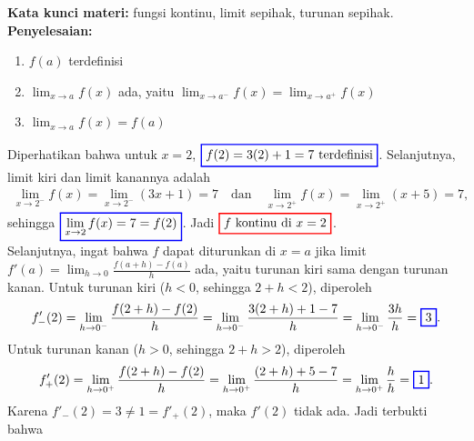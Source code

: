 \documentclass[10pt,openany,a4paper]{article}
\theoremstyle{definition}
\theoremstyle{definition}
\theoremstyle{plain}
\newenvironment{jawab}[2][tes]{%
\par\noindent\textbf{Kata kunci materi:} #1.\\
\textbf{Penyelesaian:} #2%
}{}
\begin{document}
\begin{enumerate}
\begin{jawab}[fungsi kontinu, limit sepihak, turunan sepihak]
{                \begin{enumerate}
                    \item \(f(a)\) terdefinisi
                    \item \(\displaystyle \lim_{x \to a} f(x)\) ada, yaitu $\displaystyle \lim_{x \to a^-} f(x) = \lim_{x \to a^+} f(x)$
                    \item \(\displaystyle\lim_{x \to a} f(x) = f(a)\)
                \end{enumerate}
                Diperhatikan bahwa untuk $x=2$, $\colorlet{oldcolor}{.}
        \color{blue}
        \setlength{\fboxrule}{1pt} \boxed{\color{oldcolor}f(2) = 3(2)+1 = 7~\text{terdefinisi}}\color{oldcolor}$. Selanjutnya, limit kiri dan limit kanannya adalah
                \begin{align*}
                    \lim_{x\to 2^-} f(x) = \lim_{x\to 2^-} (3x+1) = 7 \quad\text{dan}\quad \lim_{x\to 2^+} f(x) = \lim_{x\to 2^+} (x+5) = 7,
                \end{align*}
                sehingga $\colorlet{oldcolor}{.}
        \color{blue}
        \setlength{\fboxrule}{1pt} \boxed{\color{oldcolor}\lim_{x\to 2} f(x) = 7 = f(2)}\color{oldcolor}$. Jadi $\colorlet{oldcolor}{.}
        \color{red}
        \setlength{\fboxrule}{1pt} \boxed{\color{oldcolor}f \text{ kontinu di } x=2}\color{oldcolor}$.\\
                Selanjutnya, ingat bahwa $f$ dapat diturunkan di $x=a$ jika limit $\displaystyle f'(a)=\lim_{h\to 0}\frac{f(a+h)-f(a)}{h}$ ada, yaitu turunan kiri sama dengan turunan kanan. Untuk turunan kiri ($h<0$, sehingga $2+h<2$), diperoleh
                \begin{align*}
                    f'_-(2) = \lim_{h\to 0^-}\frac{f(2+h)-f(2)}{h} = \lim_{h\to 0^-}\frac{3(2+h)+1-7}{h} = \lim_{h\to 0^-}\frac{3h}{h} = \colorlet{oldcolor}{.}
        \color{blue}
        \setlength{\fboxrule}{1pt} \boxed{\color{oldcolor}3}\color{oldcolor}.
                \end{align*}
                Untuk turunan kanan ($h>0$, sehingga $2+h>2$), diperoleh
                \begin{align*}
                    f'_+(2) = \lim_{h\to 0^+}\frac{f(2+h)-f(2)}{h} = \lim_{h\to 0^+}\frac{(2+h)+5-7}{h} = \lim_{h\to 0^+}\frac{h}{h} = \colorlet{oldcolor}{.}
        \color{blue}
        \setlength{\fboxrule}{1pt} \boxed{\color{oldcolor}1}\color{oldcolor}.
                \end{align*}
                Karena $f'_-(2)=3\neq 1=f'_+(2)$, maka $f'(2)$ tidak ada. Jadi terbukti bahwa
}
\end{jawab}
\end{enumerate}
\end{document}
